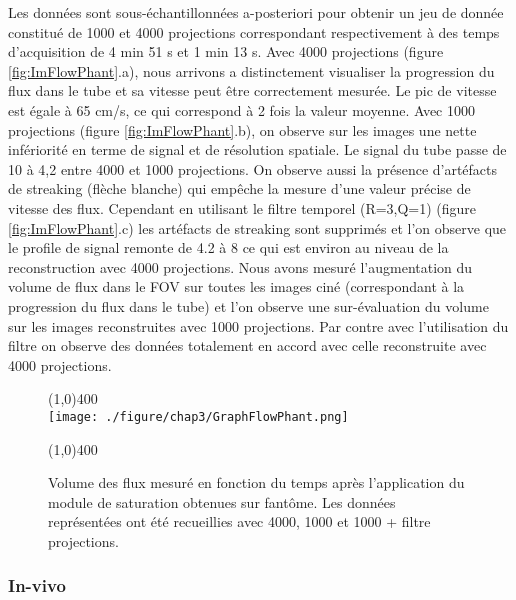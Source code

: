 Les données sont sous-échantillonnées a-posteriori pour obtenir un jeu de donnée constitué de 1000 et 4000 projections correspondant respectivement à des temps d'acquisition de 4 min 51 s et 1 min 13 s. Avec 4000 projections (figure \ref{fig:ImFlowPhant}.a), nous arrivons a distinctement visualiser la progression du flux dans le tube et sa vitesse peut être correctement mesurée. Le pic de vitesse est égale à 65 cm/s, ce qui correspond à 2 fois la valeur moyenne. Avec 1000 projections (figure \ref{fig:ImFlowPhant}.b), on observe sur les images une nette infériorité en terme de signal et de résolution spatiale. Le signal du tube passe de 10 à 4,2 entre 4000 et 1000 projections. On observe aussi la présence d'artéfacts de streaking (flèche blanche) qui empêche la mesure d'une valeur précise de vitesse des flux. Cependant en utilisant le filtre temporel (R=3,Q=1) (figure \ref{fig:ImFlowPhant}.c) les artéfacts de streaking sont supprimés et l'on observe que le profile de signal remonte de 4.2 à 8 ce qui est environ au niveau de la reconstruction avec 4000 projections.
Nous avons mesuré l'augmentation du volume de flux dans le FOV sur toutes les images ciné (correspondant à la progression du flux dans le tube) et l'on observe une sur-évaluation du volume sur les images reconstruites avec 1000 projections. Par contre avec l'utilisation du filtre on observe des données totalement en accord avec celle reconstruite avec 4000 projections.
\begin{figure}[H]
\centering \line(1,0){400} \\
\texttt{[image: ./figure/chap3/GraphFlowPhant.png]}
\caption[Graphique de progression du flux sur fantôme]{\label{fig:GraphFlowPhant} Volume des flux mesuré en fonction du temps après l'application du module de saturation obtenues sur fantôme. Les données représentées ont été recueillies avec 4000, 1000 et 1000 + filtre projections.}
\line(1,0){400} \\ \end{figure}

\subsubsection{In-vivo}

